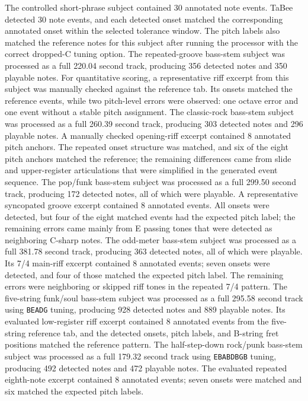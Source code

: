\documentclass[a4paper, 12pt, titlepage]{article}
\begin{document}
The controlled short-phrase subject contained 30 annotated note events. TaBee detected 30 note events, and each detected onset matched the corresponding annotated onset within the selected tolerance window. The pitch labels also matched the reference notes for this subject after running the processor with the correct dropped-C tuning option. The repeated-groove bass-stem subject was processed as a full 220.04 second track, producing 356 detected notes and 350 playable notes. For quantitative scoring, a representative riff excerpt from this subject was manually checked against the reference tab. Its onsets matched the reference events, while two pitch-level errors were observed: one octave error and one event without a stable pitch assignment. The classic-rock bass-stem subject was processed as a full 260.39 second track, producing 303 detected notes and 296 playable notes. A manually checked opening-riff excerpt contained 8 annotated pitch anchors. The repeated onset structure was matched, and six of the eight pitch anchors matched the reference; the remaining differences came from slide and upper-register articulations that were simplified in the generated event sequence. The pop/funk bass-stem subject was processed as a full 299.50 second track, producing 172 detected notes, all of which were playable. A representative syncopated groove excerpt contained 8 annotated events. All onsets were detected, but four of the eight matched events had the expected pitch label; the remaining errors came mainly from E passing tones that were detected as neighboring C-sharp notes. The odd-meter bass-stem subject was processed as a full 381.78 second track, producing 363 detected notes, all of which were playable. Its 7/4 main-riff excerpt contained 8 annotated events; seven onsets were detected, and four of those matched the expected pitch label. The remaining errors were neighboring or skipped riff tones in the repeated 7/4 pattern. The five-string funk/soul bass-stem subject was processed as a full 295.58 second track using \texttt{BEADG} tuning, producing 928 detected notes and 889 playable notes. Its evaluated low-register riff excerpt contained 8 annotated events from the five-string reference tab, and the detected onsets, pitch labels, and B-string fret positions matched the reference pattern. The half-step-down rock/punk bass-stem subject was processed as a full 179.32 second track using \texttt{EBABDBGB} tuning, producing 492 detected notes and 472 playable notes. The evaluated repeated eighth-note excerpt contained 8 annotated events; seven onsets were matched and six matched the expected pitch labels.
\end{document}
